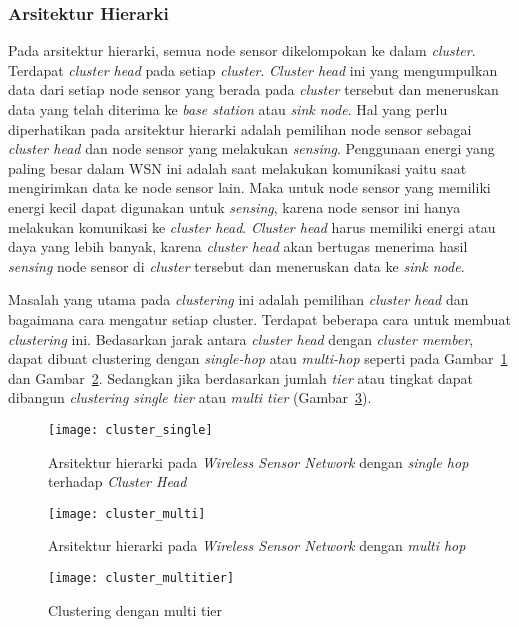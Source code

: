 \subsubsection{Arsitektur Hierarki \cite{a_wireless_sensor}}
Pada arsitektur hierarki, semua node sensor dikelompokan ke dalam \textit{cluster}. Terdapat \textit{cluster head} pada setiap \textit{cluster}. \textit{Cluster head} ini yang mengumpulkan data dari setiap node sensor yang berada pada \textit{cluster} tersebut dan meneruskan data yang telah diterima ke \textit{base station} atau \textit{sink node}. Hal yang perlu diperhatikan pada arsitektur hierarki adalah pemilihan node sensor sebagai \textit{cluster head} dan node sensor yang melakukan \textit{sensing}. Penggunaan energi yang paling besar dalam WSN ini adalah saat melakukan komunikasi yaitu saat mengirimkan data ke node sensor lain. Maka untuk node sensor yang memiliki energi kecil dapat digunakan untuk \textit{sensing}, karena node sensor ini hanya melakukan komunikasi ke \textit{cluster head}. \textit{Cluster head} harus memiliki energi atau daya yang lebih banyak, karena \textit{cluster head} akan bertugas menerima hasil \textit{sensing} node sensor di \textit{cluster} tersebut dan meneruskan data ke \textit{sink node}. 

Masalah yang utama pada \textit{clustering} ini adalah pemilihan \textit{cluster head} dan bagaimana cara mengatur setiap cluster. Terdapat beberapa cara untuk membuat \textit{clustering} ini. Bedasarkan jarak antara \textit{cluster head} dengan \textit{cluster member}, dapat dibuat clustering dengan \textit{single-hop} atau \textit{multi-hop} seperti pada Gambar~\ref{fig:cluster_single} dan Gambar~\ref{fig:cluster_multi}. Sedangkan jika berdasarkan jumlah \textit{tier} atau tingkat dapat dibangun \textit{clustering single tier} atau \textit{multi tier} (Gambar~\ref{fig:cluster_multitier}).
\begin{figure} [H]
	\centering  
	\texttt{[image: cluster\_single]}  
	\caption[Arsitektur hierarki pada \textit{Wireless Sensor Network} dengan \textit{single hop} terhadap \textit{Cluster Head}]{Arsitektur hierarki pada \textit{Wireless Sensor Network} dengan \textit{single hop} terhadap \textit{Cluster Head}} 
	\label{fig:cluster_single} 
\end{figure} 
\begin{figure} [H]
	\centering  
	\texttt{[image: cluster\_multi]}  
	\caption[Arsitektur hierarki pada \textit{Wireless Sensor Network} dengan \textit{multi hop}]{Arsitektur hierarki pada \textit{Wireless Sensor Network} dengan \textit{multi hop}} 
	\label{fig:cluster_multi} 
\end{figure} 
\begin{figure} [H]
	\centering  
	\texttt{[image: cluster\_multitier]}  
	\caption[Clsutering dengan multi tier]{Clustering dengan multi tier} 
	\label{fig:cluster_multitier} 
\end{figure}

